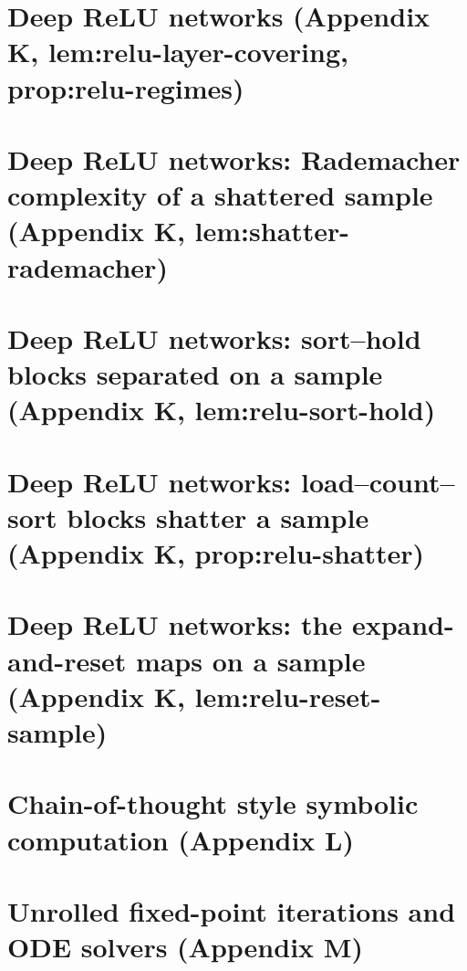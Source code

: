 \section{Deep ReLU networks (Appendix K, lem:relu-layer-covering, prop:relu-regimes)}

\section{Deep ReLU networks: Rademacher complexity of a shattered sample (Appendix K, lem:shatter-rademacher)}

\section{Deep ReLU networks: sort--hold blocks separated on a sample (Appendix K, lem:relu-sort-hold)}

\section{Deep ReLU networks: load--count--sort blocks shatter a sample (Appendix K, prop:relu-shatter)}

\section{Deep ReLU networks: the expand-and-reset maps on a sample (Appendix K, lem:relu-reset-sample)}

\section{Chain-of-thought style symbolic computation (Appendix L)}

\section{Unrolled fixed-point iterations and ODE solvers (Appendix M)}
